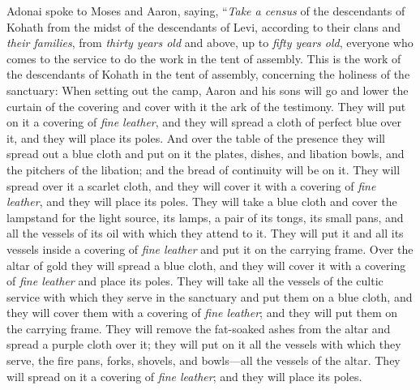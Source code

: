 \begin{biblechapter} %
 Adonai spoke to Moses and Aaron, saying,
\verse “\textit{Take a census} of the descendants of Kohath from the midst of the descendants of Levi, according to their clans and \textit{their families},
\verse from \textit{thirty years old} and above, up to \textit{fifty years old}, everyone who comes to the service to do the work in the tent of assembly.
\verse This is the work of the descendants of Kohath in the tent of assembly, concerning the holiness of the sanctuary:
\verse When setting out the camp, Aaron and his sons will go and lower the curtain of the covering and cover with it the ark of the testimony.
\verse They will put on it a covering of \textit{fine leather}, and they will spread a cloth of perfect blue over it, and they will place its poles.
\verse And over the table of the presence they will spread out a blue cloth and put on it the plates, dishes, and libation bowls, and the pitchers of the libation; and the bread of continuity will be on it.
\verse They will spread over it a scarlet cloth, and they will cover it with a covering of \textit{fine leather}, and they will place its poles.
\verse They will take a blue cloth and cover the lampstand for the light source, its lamps, a pair of its tongs, its small pans, and all the vessels of its oil with which they attend to it.
\verse They will put it and all its vessels inside a covering of \textit{fine leather} and put it on the carrying frame.
\verse Over the altar of gold they will spread a blue cloth, and they will cover it with a covering of \textit{fine leather} and place its poles.
\verse They will take all the vessels of the cultic service with which they serve in the sanctuary and put them on a blue cloth, and they will cover them with a covering of \textit{fine leather}; and they will put them on the carrying frame.
\verse They will remove the fat-soaked ashes from the altar and spread a purple cloth over it;
\verse they will put on it all the vessels with which they serve, the fire pans, forks, shovels, and bowls—all the vessels of the altar. They will spread on it a covering of \textit{fine leather}; and they will place its poles.

\end{biblechapter}
